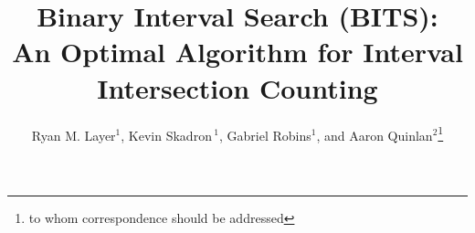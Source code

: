 \documentclass{bioinfo}
\begin{document}

	\title[Optimal Interval Intersection Counting]{
	Binary Interval Search (BITS):  \\
	An Optimal Algorithm for Interval Intersection Counting}

	\author[Sample \textit{et~al}]
	{Ryan M. Layer$^1$, 
	Kevin Skadron\,$^1$,
	Gabriel Robins$^1$, 
	and
	Aaron Quinlan$^2$\footnote{to whom correspondence should be addressed}}
	\address{$^{1}$Department of Computer Science, University of Virginia,
	Charlottesville, VA\\
	$^{2}$Department of Public Health Sciences and Center for Public Health
	Genomics, Univeristy of Virginia, Charlottesville, VA}



	\maketitle
\end{document}
